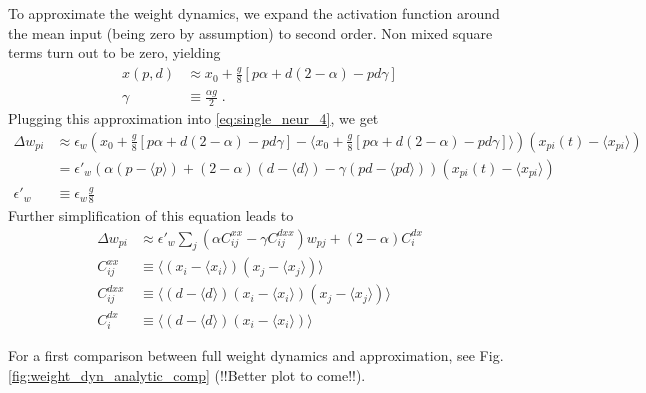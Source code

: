\documentclass[10pt,a4paper]{article}
\newcommand{\avg}[1]{\langle #1 \rangle}
\begin{document}
To approximate the weight dynamics, we expand the activation function around the mean input (being zero by assumption) to second order. Non mixed square terms turn out to be zero, yielding
\begin{align}
x\left(p,d\right) &\approx  x_0 + \frac{g}{8} \left[ p \alpha  + d(2-\alpha) - pd \gamma\right] \\
\gamma &\equiv \frac{\alpha g}{2} \; .
\end{align}
Plugging this approximation into \eqref{eq:single_neur_4}, we get
\begin{align}
\Delta w_{pi} &\approx \epsilon_w \left(x_0 + \frac{g}{8} \left[ p \alpha  + d(2-\alpha) - pd \gamma\right] -\langle x_0 + \frac{g}{8} \left[ p \alpha  + d(2-\alpha) - pd \gamma\right] \rangle\right)\left(x_{pi}(t)-\langle x_{pi} \rangle \right) \\
&= \epsilon'_w \left(  \alpha (p - \avg{p}) + (2-\alpha)(d-\avg{d}) - \gamma (pd - \avg{pd})\right)\left(x_{pi}(t)-\langle x_{pi} \rangle \right) \\
\epsilon'_w &\equiv \epsilon_w \frac{g}{8}
\end{align}
Further simplification of this equation leads to
\begin{align}
\Delta w_{pi} &\approx \epsilon'_w \sum_j \left( \alpha C^{xx}_{ij} - \gamma C^{dxx}_{ij}\right)w_{pj} + (2-\alpha) C^{dx}_i \label{eq:approx_delta_w} \\
C^{xx}_{ij} &\equiv \avg{\left(x_i - \avg{x_i} \right)\left( x_j - \avg{x_j} \right)} \\
C^{dxx}_{ij} &\equiv \avg{\left(d - \avg{d} \right) \left(x_i - \avg{x_i} \right)\left( x_j - \avg{x_j} \right)} \\
C^{dx}_i &\equiv \avg{\left(d - \avg{d} \right) \left(x_i - \avg{x_i} \right)}
\end{align}

For a first comparison between full weight dynamics and approximation, see Fig. \ref{fig:weight_dyn_analytic_comp} (!!Better plot to come!!).
\end{document}

